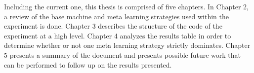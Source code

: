 Including the current one, this thesis is comprised of five chapters. In
Chapter 2, a review of the base machine and meta learning strategies used
within the experiment is done. Chapter 3 describes the structure of the code of
the experiment at a high level. Chapter 4 analyzes the results table in
order to determine whether or not one meta learning strategy strictly dominates.
Chapter 5 presents a summary of the document and presents possible future work
that can be performed to follow up on the results presented.

\pagebreak
